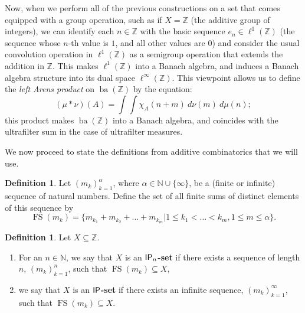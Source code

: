 \documentclass{jloganal}
\theoremstyle{definition}
\newtheorem{defn}[thm]{Definition}    %
\DeclareMathOperator{\fs}{FS}
\newcommand{\ba}{\mathop{\mathrm{ba}}}
\newcommand{\ip}{\mathnormal{\mathsf{IP}}}
\begin{document}
Now, when we perform all of the previous constructions on a set that comes equipped with a group operation, such as if $X=\mathbb Z$ (the additive group of integers), we can identify each $n\in\mathbb Z$ with the basic sequence $e_n\in\ell^1(\mathbb Z)$ (the sequence whose $n$-th value is $1$, and all other values are $0$) and consider the usual convolution operation in $\ell^1(\mathbb Z)$ as a semigroup operation that extends the addition in $\mathbb Z$. This makes $\ell^1(\mathbb Z)$ into a Banach algebra, and induces a Banach algebra structure into its dual space $\ell^\infty(\mathbb Z)$. This viewpoint allows us to define the {\it left Arens product} on $\ba(\mathbb Z)$ by the equation:
\begin{equation*}
    (\mu*\nu)(A)=\int\int\chi_A(n+m)\ d\nu(m)\ d\mu(n);
\end{equation*}
this product makes $\ba(\mathbb Z)$ into a Banach algebra, and coincides with the ultrafilter sum in the case of ultrafilter measures.


We now proceed to state the definitions from additive combinatorics that we will use.

\begin{defn}
    Let $(m_{k})_{k=1}^{\alpha}$, where $\alpha\in\mathbb N\cup\{\infty\}$, be a (finite or infinite) sequence of natural numbers. Define the set of all finite sums of distinct elements of this sequence by
    \[
    \fs(m_{k})=\{m_{k_{1}}+m_{k_{2}}+\dots+m_{k_{m}}| 1\leq k_{1}<\dots<k_{m}, 1\leq m\leq\alpha\}.
    \]
\end{defn}

\begin{defn}
    Let $X\subseteq\mathbb Z$.
    \begin{enumerate}
        \item For an $n\in\mathbb N$, we say that $X$ is an {\bf $\ip_n$-set} if there exists a sequence of length $n$, $(m_k)_{k=1}^n$, such that $\fs(m_k)\subseteq X$,
        \item we say that $X$ is an {\bf $\ip$-set} if there exists an infinite sequence, $(m_k)_{k=1}^\infty$, such that $\fs(m_k)\subseteq X$.
    \end{enumerate}    
\end{defn}
\end{document}
